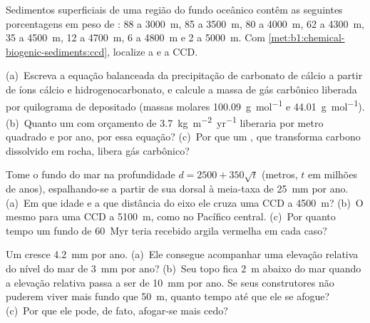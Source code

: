 \begin{exercise}[$\star$]\label{exo:b1:chemical-biogenic-sediments:4}
Sedimentos superficiais de uma região do fundo oceânico contêm as seguintes porcentagens em
peso de : 88 a \qty{3000}{m}, 85 a \qty{3500}{m}, 80 a \qty{4000}{m}, 62 a
\qty{4300}{m}, 35 a \qty{4500}{m}, 12 a \qty{4700}{m}, 6 a \qty{4800}{m} e 2 a \qty{5000}{m}.
Com \cref{met:b1:chemical-biogenic-sediments:ccd}, localize a  e a CCD.
\end{exercise}

\begin{exercise}[$\star\star$]\label{exo:b1:chemical-biogenic-sediments:5}
(a)~Escreva a equação balanceada da precipitação de carbonato de cálcio a partir de íons
cálcio e hidrogenocarbonato, e calcule a massa de gás carbônico liberada por quilograma de
 depositado (massas molares \qty{100.09}{g.mol^{-1}} e \qty{44.01}{g.mol^{-1}}).
(b)~Quanto um  com orçamento de \qty{3.7}{kg.m^{-2}.yr^{-1}} liberaria por metro
quadrado e por ano, por essa equação? (c)~Por que um , que transforma carbono
dissolvido em rocha, libera gás carbônico?
\end{exercise}

\begin{exercise}[$\star\star$]\label{exo:b1:chemical-biogenic-sediments:6}
Tome o fundo do mar na profundidade $d = 2500 + 350\sqrt t$ (metros, $t$ em milhões de anos),
espalhando-se a partir de sua dorsal à meia-taxa de \qty{25}{mm} por ano. (a)~Em que idade e a
que distância do eixo ele cruza uma CCD a \qty{4500}{m}? (b)~O mesmo para uma CCD a
\qty{5100}{m}, como no Pacífico central. (c)~Por quanto tempo um fundo de \qty{60}{Myr}
teria recebido argila vermelha em cada caso?
\end{exercise}

\begin{exercise}[$\star\star$]\label{exo:b1:chemical-biogenic-sediments:7}
Um  cresce \qty{4.2}{mm} por ano. (a)~Ele consegue acompanhar uma elevação relativa do
nível do mar de \qty{3}{mm} por ano? (b)~Seu topo fica \qty{2}{m} abaixo do mar quando a
elevação relativa passa a ser de \qty{10}{mm} por ano. Se seus construtores não puderem viver
mais fundo que \qty{50}{m}, quanto tempo até que ele se afogue? (c)~Por que ele pode, de
fato, afogar-se mais cedo?
\end{exercise}


